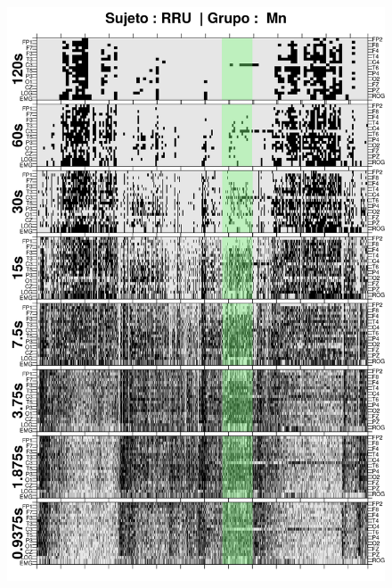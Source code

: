 
\begin{figure}
\centering
\includegraphics[width=0.9\linewidth]
{./img_ejemplos/RRMNS_comp_est_.png} 
\end{figure}

